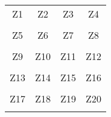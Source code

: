 \documentclass[12pt]{article}
\begin{document}
\begin{tabular}{cccc}
\hline
Z1 & Z2 & Z3 & Z4 \\
 &  &  & \\
\hline
Z5 & Z6 & Z7 & Z8 \\
 &  &  & \\
\hline
Z9 & Z10 & Z11 & Z12 \\
 &  &  & \\
\hline
Z13 & Z14 & Z15 & Z16 \\
 &  &  & \\
\hline
Z17 & Z18 & Z19 & Z20 \\
 &  &  & \\
\end{tabular}
\end{document}
